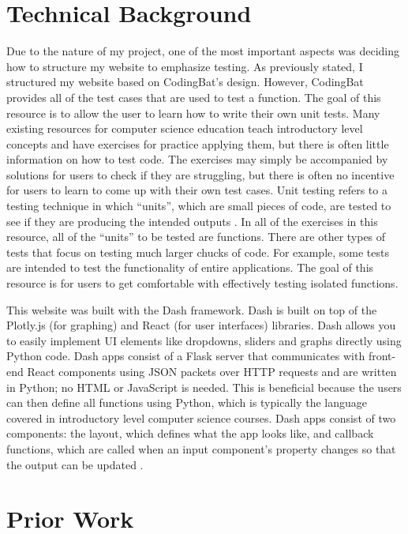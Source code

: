 \documentclass[10pt,twocolumn]{article}
\begin{document}
\section{Technical Background}

Due to the nature of my project, one of the most important aspects was deciding how to structure my website to emphasize testing. As previously stated, I structured my website based on CodingBat's design. However, CodingBat provides all of the test cases that are used to test a function. The goal of this resource is to allow the user to learn how to write their own unit tests. Many existing resources for computer science education teach introductory level concepts and have exercises for practice applying them, but there is often little information on how to test code. The exercises may simply be accompanied by solutions for users to check if they are struggling, but there is often no incentive for users to learn to come up with their own test cases. Unit testing refers to a testing technique in which \enquote{units}, which are small pieces of code, are tested to see if they are producing the intended outputs \cite{Unit}. In all of the exercises in this resource, all of the \enquote{units} to be tested are functions. There are other types of tests that focus on testing much larger chucks of code. For example, some tests are intended to test the functionality of entire applications. The goal of this resource is for users to get comfortable with effectively testing isolated functions.

This website was built with the Dash framework. Dash is built on top of the Plotly.js (for graphing) and React (for user interfaces) libraries. Dash allows you to easily implement UI elements like dropdowns, sliders and graphs directly using Python code. Dash apps consist of a Flask server that communicates with front-end React components using JSON packets over HTTP requests and are written in Python; no HTML or JavaScript is needed. This is beneficial because the users can then define all functions using Python, which is typically the language covered in introductory level computer science courses. Dash apps consist of two components: the layout, which defines what the app looks like, and callback functions, which are called when an input component’s property changes so that the output can be updated \cite{Dash}.

\section{Prior Work}
\end{document}
